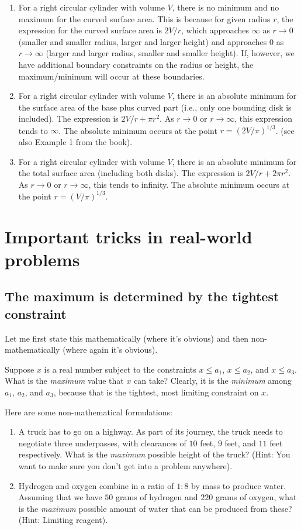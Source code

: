 \documentclass[10pt]{amsart}
\begin{document}
\begin{enumerate}
\item For a right circular cylinder with volume $V$, there is no
  minimum and no maximum for the curved surface area. This is because
  for given radius $r$, the expression for the curved surface area is
  $2V/r$, which approaches $\infty$ as $r \to 0$ (smaller and smaller
  radius, larger and larger height) and approaches $0$ as $r \to
  \infty$ (larger and larger radius, smaller and smaller height). If,
  however, we have additional boundary constraints on the radius or
  height, the maximum/minimum will occur at these boundaries.
\item For a right circular cylinder with volume $V$, there is an
  absolute minimum for the surface area of the base plus curved part
  (i.e., only one bounding disk is included). The expression is $2V/r
  + \pi r^2$. As $r \to 0$ or $r \to \infty$, this expression tends to
  $\infty$. The absolute minimum occurs at the point $r =
  (2V/\pi)^{1/3}$. (see also Example 1 from the book).
\item For a right circular cylinder with volume $V$, there is an
  absolute minimum for the total surface area (including both
  disks). The expression is $2V/r + 2\pi r^2$. As $r \to 0$ or $r \to
  \infty$, this tends to infinity. The absolute minimum occurs at the
  point $r = (V/\pi)^{1/3}$.
\end{enumerate}

\section{Important tricks in real-world problems}

\subsection{The maximum is determined by the tightest constraint}

Let me first state this mathematically (where it's obvious) and then
non-mathematically (where again it's obvious).

Suppose $x$ is a real number subject to the constraints $x \le a_1$,
$x \le a_2$, and $x \le a_3$. What is the {\em maximum} value that $x$
can take? Clearly, it is the {\em minimum} among $a_1$, $a_2$, and
$a_3$, because that is the tightest, most limiting constraint on $x$.

Here are some non-mathematical formulations:

\begin{enumerate}
\item A truck has to go on a highway. As part of its journey, the
  truck needs to negotiate three underpasses, with clearances of $10$
  feet, $9$ feet, and $11$ feet respectively. What is the {\em
  maximum} possible height of the truck? (Hint: You want to make sure
  you don't get into a problem anywhere).
\item Hydrogen and oxygen combine in a ratio of $1:8$ by mass to
  produce water. Assuming that we have $50$ grams of hydrogen and
  $220$ grams of oxygen, what is the {\em maximum} possible amount of
  water that can be produced from these? (Hint: Limiting reagent).
\end{enumerate}
\end{document}
